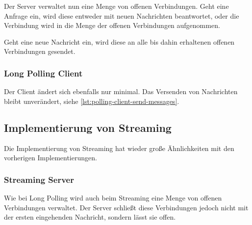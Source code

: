 \documentclass[sigplan, screen]{acmart}
\begin{document}
Der Server verwaltet nun eine Menge von offenen Verbindungen.
Geht eine Anfrage ein, wird diese entweder mit neuen Nachrichten beantwortet, oder die Verbindung wird in die Menge der offenen Verbindungen aufgenommen.



Geht eine neue Nachricht ein, wird diese an alle bis dahin erhaltenen offenen Verbindungen gesendet.



\subsubsection{Long Polling Client}

Der Client ändert sich ebenfalls nur minimal.
Das Versenden von Nachrichten bleibt unverändert, siehe \autoref{lst:polling-client-send-messages}.



\subsection{Implementierung von Streaming}

Die Implementierung von Streaming hat wieder große Ähnlichkeiten mit den vorherigen Implementierungen.

\subsubsection{Streaming Server}

Wie bei Long Polling wird auch beim Streaming eine Menge von offenen Verbindungen verwaltet.
Der Server schließt diese Verbindungen jedoch nicht mit der ersten eingehenden Nachricht, sondern lässt sie offen.


\end{document}

